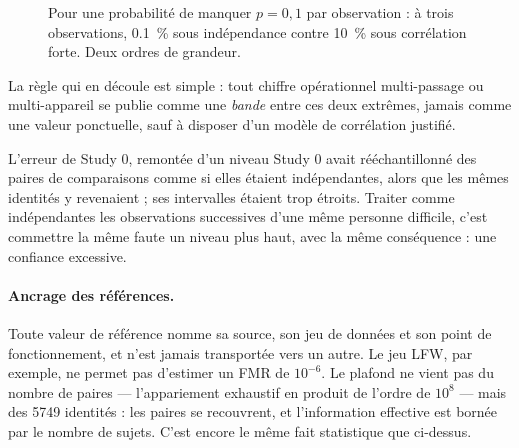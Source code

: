 \documentclass[11pt,a4paper]{article}
\begin{document}
\begin{figure}[h]
\centering
{}
\caption{Pour une probabilité de manquer $p = 0{,}1$ par observation : à trois
observations, \num{0,1}~\% sous indépendance contre \SI{10}{\percent} sous corrélation
forte. Deux ordres de grandeur.}
\label{fig:correlation}
\end{figure}

La règle qui en découle est simple : tout chiffre opérationnel multi-passage ou
multi-appareil se publie comme une \emph{bande} entre ces deux extrêmes, jamais comme
une valeur ponctuelle, sauf à disposer d'un modèle de corrélation justifié.

\begin{encadre}{L'erreur de Study 0, remontée d'un niveau}
Study 0 avait rééchantillonné des paires de comparaisons comme si elles étaient
indépendantes, alors que les mêmes identités y revenaient ; ses intervalles étaient
trop étroits. Traiter comme indépendantes les observations successives d'une même
personne difficile, c'est commettre la même faute un niveau plus haut, avec la même
conséquence : une confiance excessive.
\end{encadre}

\paragraph{Ancrage des références.} Toute valeur de référence nomme sa source, son
jeu de données et son point de fonctionnement, et n'est jamais transportée vers un
autre. Le jeu LFW, par exemple, ne permet pas d'estimer un FMR de $10^{-6}$. Le plafond
ne vient pas du nombre de paires — l'appariement exhaustif en produit de l'ordre de
$10^{8}$ — mais des \num{5749} identités : les paires se recouvrent, et l'information
effective est bornée par le nombre de sujets. C'est encore le même fait statistique
que ci-dessus.
\end{document}
